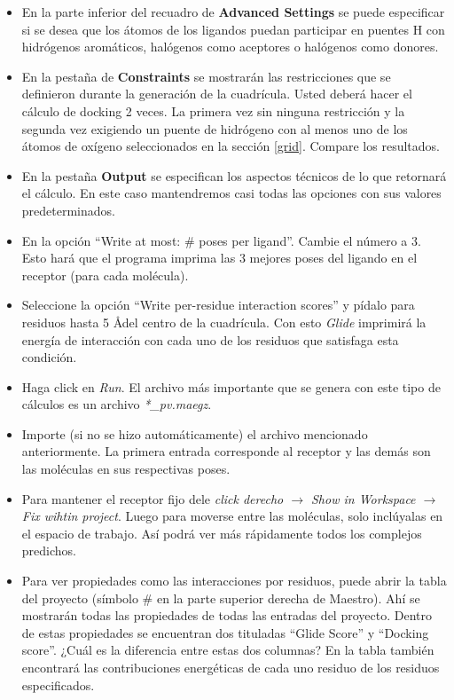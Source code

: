\documentclass{article}
\begin{document}
\begin{itemize}
    \item En la parte inferior del recuadro de \textbf{Advanced Settings} se puede especificar si se desea que los átomos de los ligandos puedan participar en puentes H con hidrógenos aromáticos, halógenos como aceptores o halógenos como donores.
    \item En la pestaña de \textbf{Constraints} se mostrarán las restricciones que se definieron durante la generación de la cuadrícula. Usted deberá hacer el cálculo de docking 2 veces. La primera vez sin ninguna restricción y la segunda vez exigiendo un puente de hidrógeno con al menos uno de los átomos de oxígeno seleccionados en la sección \ref{grid}. Compare los resultados.
    \item En la pestaña \textbf{Output} se especifican los aspectos técnicos de lo que retornará el cálculo. En este caso mantendremos casi todas las opciones con sus valores predeterminados.
    \item En la opción ``Write at most: \# poses per ligand''. Cambie el número a 3. Esto hará que el programa imprima las 3 mejores poses del ligando en el receptor (para cada molécula).
    \item Seleccione la opción ``Write per-residue interaction scores'' y pídalo para residuos hasta 5 \AA del centro de la cuadrícula. Con esto \emph{Glide} imprimirá la energía de interacción con cada uno de los residuos que satisfaga esta condición.
    \item Haga click en \emph{Run}. El archivo más importante que se genera con este tipo de cálculos es un archivo \emph{*\_pv.maegz}.
    \item Importe (si no se hizo automáticamente) el archivo mencionado anteriormente. La primera entrada corresponde al receptor y las demás son las moléculas en sus respectivas poses.
    \item Para mantener el receptor fijo dele \emph{click derecho $\rightarrow$ Show in Workspace $\rightarrow$ Fix wihtin project}. Luego para moverse entre las moléculas, solo inclúyalas en el espacio de trabajo. Así podrá ver más rápidamente todos los complejos predichos.
    \item Para ver propiedades como las interacciones por residuos, puede abrir la tabla del proyecto (símbolo \# en la parte superior derecha de Maestro). Ahí se mostrarán todas las propiedades de todas las entradas del proyecto. Dentro de estas propiedades se encuentran dos tituladas ``Glide Score''  y ``Docking score''. ¿Cuál es la diferencia entre estas dos columnas? En la tabla también encontrará las contribuciones energéticas de cada uno residuo de los residuos especificados.
\end{itemize}
\end{document}
